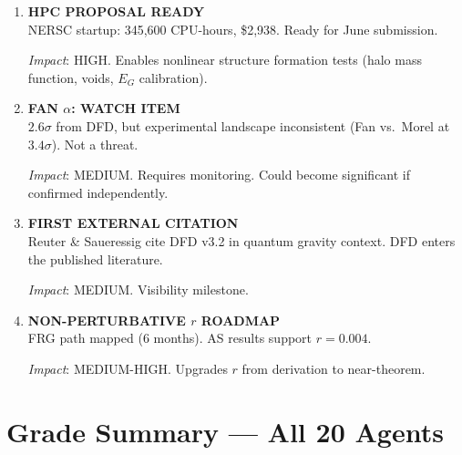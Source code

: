 \documentclass[11pt,a4paper]{article}
\begin{document}
\begin{enumerate}[label=\textbf{\arabic*.}, leftmargin=1.5cm]
\item \textbf{HPC PROPOSAL READY}\\
NERSC startup: 345,600 CPU-hours, \$2,938. Ready for June submission.

\textit{Impact}: HIGH. Enables nonlinear structure formation tests (halo mass function, voids, $E_G$ calibration).

\item \textbf{FAN $\alpha$: WATCH ITEM}\\
$2.6\sigma$ from DFD, but experimental landscape inconsistent (Fan vs.\ Morel at $3.4\sigma$). Not a threat.

\textit{Impact}: MEDIUM. Requires monitoring. Could become significant if confirmed independently.

\item \textbf{FIRST EXTERNAL CITATION}\\
Reuter \& Saueressig cite DFD v3.2 in quantum gravity context. DFD enters the published literature.

\textit{Impact}: MEDIUM. Visibility milestone.

\item \textbf{NON-PERTURBATIVE $r$ ROADMAP}\\
FRG path mapped (6 months). AS results support $r = 0.004$.

\textit{Impact}: MEDIUM-HIGH. Upgrades $r$ from derivation to near-theorem.

\end{enumerate}


\section{Grade Summary --- All 20 Agents}
\label{sec:grades}
\end{document}
